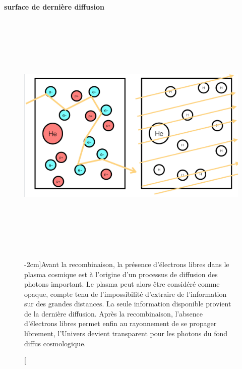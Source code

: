 \paragraph{surface de dernière diffusion}

\begin{figure}[htbp]
	\centering
		\includegraphics[height=12cm]{figs/diffusion.png}
	\caption[Le plasma cosmique avant la recombinaison][-2cm]{Avant la recombinaison, la présence d'électrons libres dans le plasma cosmique est à l'origine d'un processus de diffusion des photons important. Le plasma peut alors être considéré comme opaque, compte tenu de l'impossibilité d'extraire de l'information sur des grandes distances. La seule information disponible provient de la dernière diffusion. Après la recombinaison, l'absence d'électrons libres permet enfin au rayonnement de se propager librement, l'Univers devient transparent pour les photons du fond diffus cosmologique.}
	\label{f:diffusion}
\end{figure}

